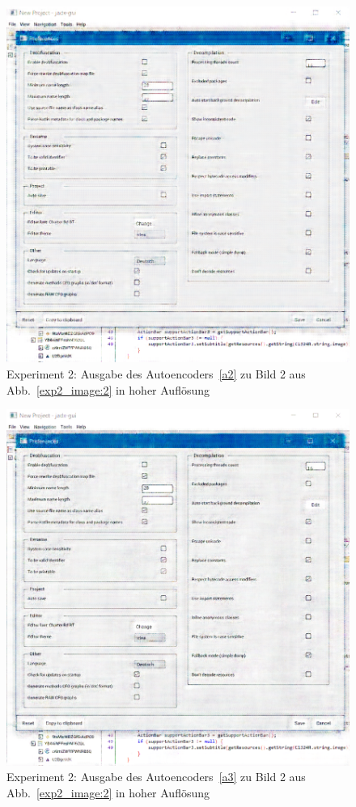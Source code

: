 \begin{figure} [ht]
  \centering
  \includegraphics[width=\textwidth]{bilder/result_exp2/1_pred_a2.png}

  \caption{Experiment 2: Ausgabe des Autoencoders~\ref{a2} zu Bild 2 aus Abb.~\ref{exp2_image:2} in hoher Auflösung}
\end{figure}

\begin{figure} [ht]
  \centering
  \includegraphics[width=\textwidth]{bilder/result_exp2/1_pred_a3.png}

  \caption{Experiment 2: Ausgabe des Autoencoders~\ref{a3} zu Bild 2 aus Abb.~\ref{exp2_image:2} in hoher Auflösung}
\end{figure}

